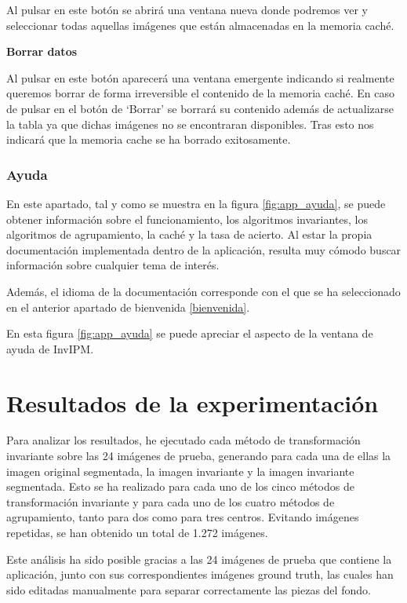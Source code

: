 Al pulsar en este botón se abrirá una ventana nueva donde podremos ver y seleccionar todas aquellas imágenes que están almacenadas en la memoria caché.

\textbf{Borrar datos}\label{borrar-datos}

Al pulsar en este botón aparecerá una ventana emergente indicando si realmente queremos borrar de forma irreversible el contenido de la memoria caché. En caso de pulsar en el botón de `Borrar' se borrará su contenido además de actualizarse la tabla ya que dichas imágenes no se encontraran disponibles. Tras esto nos indicará que la memoria cache se ha borrado exitosamente.

\subsubsection{Ayuda}\label{ayuda}

En este apartado, tal y como se muestra en la figura \ref{fig:app_ayuda}, se puede obtener información sobre el funcionamiento, los algoritmos invariantes, los algoritmos de agrupamiento, la caché y la tasa de acierto. Al estar la propia documentación implementada dentro de la aplicación, resulta muy cómodo buscar información sobre cualquier tema de interés. 

Además, el idioma de la documentación corresponde con el que se ha seleccionado en el anterior apartado de bienvenida \ref{bienvenida}.


En esta figura \ref{fig:app_ayuda} se puede apreciar el aspecto de la ventana de ayuda de InvIPM.

\section{Resultados de la experimentación}\label{resultados-de-la-experimentación}

Para analizar los resultados, he ejecutado cada método de transformación invariante sobre las 24 imágenes de prueba, generando para cada una de ellas la imagen original segmentada, la imagen invariante y la imagen invariante segmentada. Esto se ha realizado para cada uno de los cinco métodos de transformación invariante y para cada uno de los cuatro métodos de agrupamiento, tanto para dos como para tres centros. Evitando imágenes repetidas, se han obtenido un total de 1.272 imágenes.

Este análisis ha sido posible gracias a las 24 imágenes de prueba que contiene la aplicación, junto con sus correspondientes imágenes ground truth, las cuales han sido editadas manualmente para separar correctamente las piezas del fondo.

